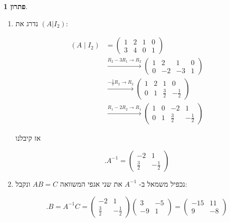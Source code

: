 \documentclass[12pt]{report}
\theoremstyle{plain}
\theoremstyle{definition}
\newtheorem*{solution}{פתרון}
\newcommand{\0}{\mathbf{0}}
\begin{document}
\begin{solution}\
\begin{enumerate}[label=\alph*.]
\item
נדרג את
$(A|I_2)$:

\begin{align*}
\left(A \mid I_2\right)
&=
\left(
\begin{array}{cc|cc}
1 & 2 & 1 & 0\\
3 & 4 & 0 & 1
\end{array}
\right)
\\[4pt]
&\xrightarrow{R_2-3R_1\to R_2}
\left(
\begin{array}{cc|cc}
1 & 2 & 1 & 0\\
0 & -2 & -3 & 1
\end{array}
\right)
\\[4pt]
&\xrightarrow{-\tfrac12 R_2\to R_2}
\left(
\begin{array}{cc|cc}
1 & 2 & 1 & 0\\
0 & 1 & \tfrac32 & -\tfrac12
\end{array}
\right)
\\[4pt]
&\xrightarrow{R_1-2R_2\to R_1}
\left(
\begin{array}{cc|cc}
1 & 0 & -2 & 1\\
0 & 1 & \tfrac32 & -\tfrac12
\end{array}
\right)
\end{align*}

אז קיבלנו

$$
.A^{-1}=\begin{pmatrix}
-2 & 1\\
\tfrac32 & -\tfrac12
\end{pmatrix}
$$

\item 
נכפיל משמאל ב-
$A^{-1}$
את שני אגפי המשוואה
$AB=C$
ונקבל:

$$
.B=A^{-1}C=\begin{pmatrix}
-2 & 1\\
\tfrac32 & -\tfrac12
\end{pmatrix}\begin{pmatrix}
3 & -5 \\
-9 & 1
\end{pmatrix}=\begin{pmatrix}
-15 & 11 \\
9 & -8 
\end{pmatrix}
$$


\end{enumerate}
\end{solution}
\end{document}
